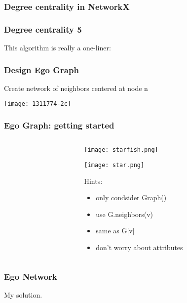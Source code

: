 \documentclass[xcolor=dvipsnames, 9pt]{beamer}
\begin{document}
\begin{frame}
\tiny
\frametitle{Degree centrality in NetworkX}

\end{frame}

\begin{frame}
\frametitle{Degree centrality 5}
This algorithm is really a one-liner:

\end{frame}

\begin{frame}
\frametitle{Design Ego Graph}
\centerline{Create network of neighbors centered at node n}
\centerline{\texttt{[image: 1311774-2c]}}
\end{frame}

\begin{frame}
\frametitle{Ego Graph: getting started}
\begin{columns}
\begin{column}{0.6\textwidth}
\small

\end{column}
\begin{column}{0.4\textwidth}
\centerline{\texttt{[image: starfish.png]}}
\centerline{\texttt{[image: star.png]}}


Hints:
\begin{itemize}
\item only condsider Graph()
\item use G.neighbors(v) 
\item same as G[v]
\item don't worry about attributes
\end{itemize}

\end{column}
\end{columns}
\end{frame}

\begin{frame}
\frametitle{Ego Network}

My solution.

\end{frame}
\end{document}
